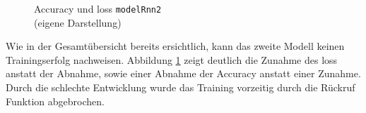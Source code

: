 \documentclass[
    12pt, %
    DIV10,
    ngerman, %
    a4paper, %
    oneside, %
    titlepage, %
    parskip=half, %
    headings=normal, %
    listof=totoc, %
    bibliography=totoc, %
    index=totoc, %
    captions=tableheading, %
    final %
]{scrreprt}
\begin{document}
\begin{figure}[H]
\caption{Accuracy und loss \texttt{modelRnn2}\\(eigene Darstellung)}\label{fig:rnn2}
\end{figure}
Wie in der Gesamtübersicht bereits ersichtlich, kann das zweite Modell keinen Trainingserfolg nachweisen. 
Abbildung \ref{fig:rnn2} zeigt deutlich die Zunahme des loss anstatt der Abnahme, sowie einer Abnahme der Accuracy anstatt einer Zunahme. Durch die schlechte Entwicklung wurde das Training vorzeitig durch die Rückruf Funktion abgebrochen.
\end{document}
